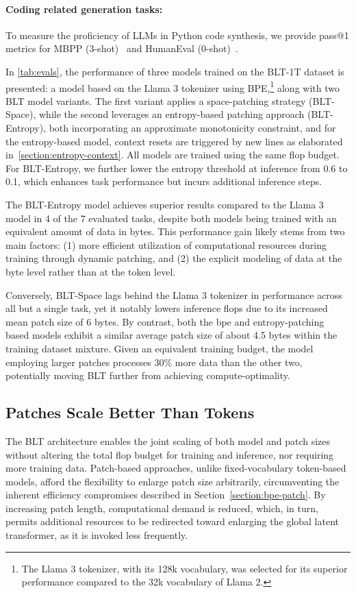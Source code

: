 \paragraph{Coding related generation tasks:} To measure the proficiency of LLMs in Python code synthesis, we provide pass@1 metrics for MBPP (3-shot)~\citep{Eval_MBPP} and HumanEval (0-shot)~\citep{Eval_HumanEval}.

In \autoref{tab:evals}, the performance of three models trained on the {\textsc BLT}-1T dataset is presented: a model based on the Llama 3 tokenizer using BPE,\footnote{The Llama 3 tokenizer, with its 128k vocabulary, was selected for its superior performance compared to the 32k vocabulary of Llama 2.} along with two {\textsc BLT} model variants. The first variant applies a space-patching strategy ({\textsc BLT}-Space), while the second leverages an entropy-based patching approach ({\textsc BLT}-Entropy), both incorporating an approximate monotonicity constraint, and for the entropy-based model, context resets are triggered by new lines as elaborated in~\autoref{section:entropy-context}. All models are trained using the same flop budget. For {\textsc BLT}-Entropy, we further lower the entropy threshold at inference from 0.6 to 0.1, which enhances task performance but incurs additional inference steps.

The {\textsc BLT}-Entropy model achieves superior results compared to the Llama 3 model in 4 of the 7 evaluated tasks, despite both models being trained with an equivalent amount of data in bytes. This performance gain likely stems from two main factors: (1) more efficient utilization of computational resources during training through dynamic patching, and (2) the explicit modeling of data at the byte level rather than at the token level.

Conversely, {\textsc BLT}-Space lags behind the Llama 3 tokenizer in performance across all but a single task, yet it notably lowers inference flops due to its increased mean patch size of 6 bytes. By contrast, both the bpe and entropy-patching based models exhibit a similar average patch size of about 4.5 bytes within the training dataset mixture. Given an equivalent training budget, the model employing larger patches processes 30\% more data than the other two, potentially moving {\textsc BLT} further from achieving compute-optimality.

\subsection{Patches Scale Better Than Tokens} The {\textsc BLT} architecture enables the joint scaling of both model and patch sizes without altering the total flop budget for training and inference, nor requiring more training data. Patch-based approaches, unlike fixed-vocabulary token-based models, afford the flexibility to enlarge patch size arbitrarily, circumventing the inherent efficiency compromises described in Section~\ref{section:bpe-patch}. By increasing patch length, computational demand is reduced, which, in turn, permits additional resources to be redirected toward enlarging the global latent transformer, as it is invoked less frequently.

